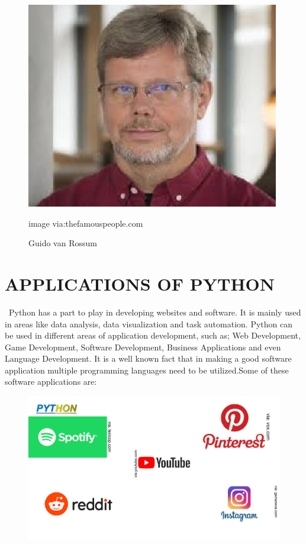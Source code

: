 \documentclass[12pt]{article}
\begin{document}
\begin{figure}[h]
	\includegraphics[width=0.7\linewidth]{screenshot005}
	\caption[Guido van Rossum]{Guido van Rossum}{image via:thefamouspeople.com}
	\label{fig:screenshot005}
\end{figure}

\newpage

\section{APPLICATIONS OF PYTHON}
        \ Python has a part to play in developing websites and software. It is mainly used in areas like data analysis, data visualization and task automation. Python can be used in different areas of application development, such as; Web Development, Game Development, Software Development, Business Applications and even Language Development.
        It is a well known fact that in making a good software application multiple programming languages need to be utilized.Some of these software applications are:

\begin{figure}[h]
	\includegraphics[width=0.7\linewidth]{"screenshot 6"}
	\caption{}
	\label{fig:screenshot-6}
\end{figure}
\end{document}
